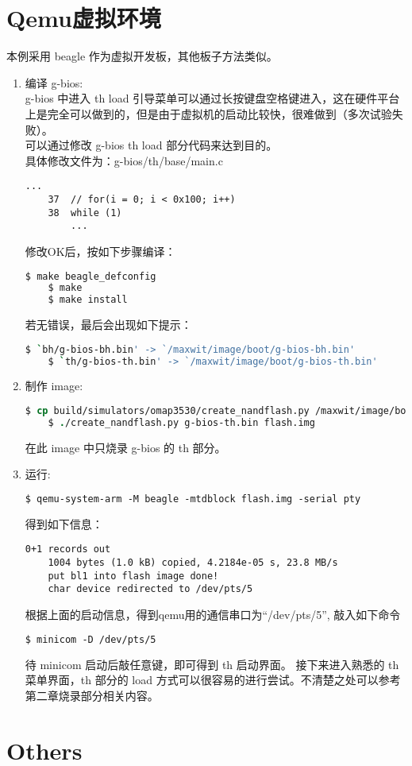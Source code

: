 \section{Qemu虚拟环境}
本例采用 beagle 作为虚拟开发板，其他板子方法类似。
\begin{enumerate}
	\item 编译 g-bios: \\
	g-bios 中进入 th load 引导菜单可以通过长按键盘空格键进入，这在硬件平台上是完全可以做到的，但是由于虚拟机的启动比较快，很难做到（多次试验失败）。\\
	可以通过修改 g-bios th load 部分代码来达到目的。\\
	具体修改文件为：g-bios/th/base/main.c
	\lstset{language=[ANSI]C}
	\begin{lstlisting}[numbers=none]
		...
	37	// for(i = 0; i < 0x100; i++)
	38	while (1)
		...
	\end{lstlisting}
	修改OK后，按如下步骤编译：
	\begin{lstlisting}[language=sh,numbers=none]
	$ make beagle_defconfig
	$ make
	$ make install
	\end{lstlisting}
	若无错误，最后会出现如下提示：
	\begin{lstlisting}[language=sh,numbers=none]
	$ `bh/g-bios-bh.bin' -> `/maxwit/image/boot/g-bios-bh.bin'
	$ `th/g-bios-th.bin' -> `/maxwit/image/boot/g-bios-th.bin'
	\end{lstlisting}

	\item 制作 image:
	\begin{lstlisting}[language=csh,numbers=none]
	$ cp build/simulators/omap3530/create_nandflash.py /maxwit/image/boot
	$ ./create_nandflash.py g-bios-th.bin flash.img
	\end{lstlisting}
	在此 image 中只烧录 g-bios 的 th 部分。

	\item 运行:
	\begin{lstlisting}[language=csh,numbers=none]
	$ qemu-system-arm -M beagle -mtdblock flash.img -serial pty
	\end{lstlisting}
	得到如下信息：
	\begin{lstlisting}[numbers=none]
	0+1 records out
	1004 bytes (1.0 kB) copied, 4.2184e-05 s, 23.8 MB/s
	put bl1 into flash image done!
	char device redirected to /dev/pts/5
	\end{lstlisting}
	根据上面的启动信息，得到qemu用的通信串口为``/dev/pts/5'',
	敲入如下命令
	\begin{lstlisting}[language=csh,numbers=none]
	$ minicom -D /dev/pts/5
	\end{lstlisting}
	待 minicom 启动后敲任意键，即可得到 th 启动界面。
	接下来进入熟悉的 th 菜单界面，th 部分的 load 方式可以很容易的进行尝试。不清楚之处可以参考第二章烧录部分相关内容。

\end{enumerate}

\section{Others}
